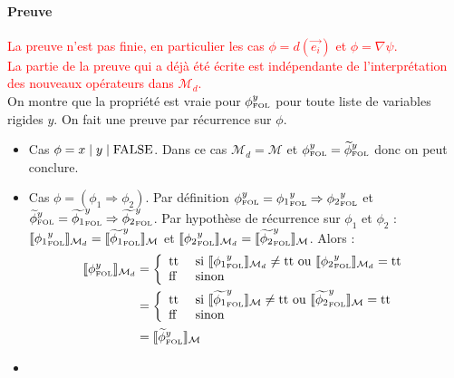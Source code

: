 \documentclass[12pt]{article}
\newcommand{\FOL}{\ensuremath{\textup{\tiny{}FOL}}}
\newcommand{\false}{\textup{ff}}
\newcommand{\true}{\textup{tt}}
\newcommand{\M}{\ensuremath{\mathcal{M}}}
\newcommand{\raph}[1]{\textcolor{red}{#1}}
\begin{document}
\paragraph{Preuve}
\raph{La preuve n'est pas finie, en particulier les cas $\phi = d(\vec{e_i})$ et $\phi = \nabla \psi$.}\\
\raph{La partie de la preuve qui a déjà été écrite est indépendante de l'interprétation des nouveaux opérateurs dans $\M_d$.}\\
On montre que la propriété est vraie pour $\phi_\FOL^y$ pour toute liste de variables rigides $y$.
On fait une preuve par récurrence sur $\phi$.
\begin{itemize}
\item
  Cas $\phi = x \; | \; y \; | \; \textup{FALSE}$.
  Dans ce cas $\M_d = \M$ et $\phi_\FOL^y = \widetilde{\phi}_\FOL^y$ donc on peut conclure.
\item
  Cas $\phi = (\phi_1 \Rightarrow \phi_2)$.
  Par définition ${\phi}_\FOL^y = {\phi_1}_\FOL^y \Rightarrow {\phi_2}_\FOL^y$ et  $\widetilde{\phi}_\FOL^y = \widetilde{\phi_1}_\FOL^y \Rightarrow \widetilde{\phi_2}_\FOL^y$.
  Par hypothèse de récurrence sur $\phi_1$ et $\phi_2$ : $\llbracket {\phi_1}_\FOL^y \rrbracket_{\M_d} = \llbracket {\widetilde{\phi_1}}_\FOL^y \rrbracket_{\M}$ et $\llbracket {\phi_2}_\FOL^y \rrbracket_{\M_d} = \llbracket {\widetilde{\phi_2}}_\FOL^y \rrbracket_{\M}$.
  Alors : 
  \begin{align*}
    \llbracket \phi_\FOL^y \rrbracket_{\M_d}
    &= \left \{
      \begin{array}{l l}
        \true & \textup{ si }  \llbracket {\phi_1}_\FOL^y \rrbracket_{\mathcal{M}_d} \neq \true \textup{ ou } \llbracket {\phi_2}_\FOL^y \rrbracket_{\mathcal{M}_d} = \true \\
        \false & \textup{ sinon }
      \end{array}
             \right . \\
    &= \left \{
      \begin{array}{l l}
        \true & \textup{ si }  \llbracket {\widetilde{\phi_1}}_\FOL^y \rrbracket_{\mathcal{M}} \neq \true \textup{ ou } \llbracket {\widetilde{\phi_2}}_\FOL^y \rrbracket_{\mathcal{M}} = \true \\
        \false & \textup{ sinon }
      \end{array}
             \right . \\
    &= \llbracket {\widetilde{\phi}}_\FOL^y \rrbracket_{\mathcal{M}}
  \end{align*}
\item

\end{itemize}
\end{document}
